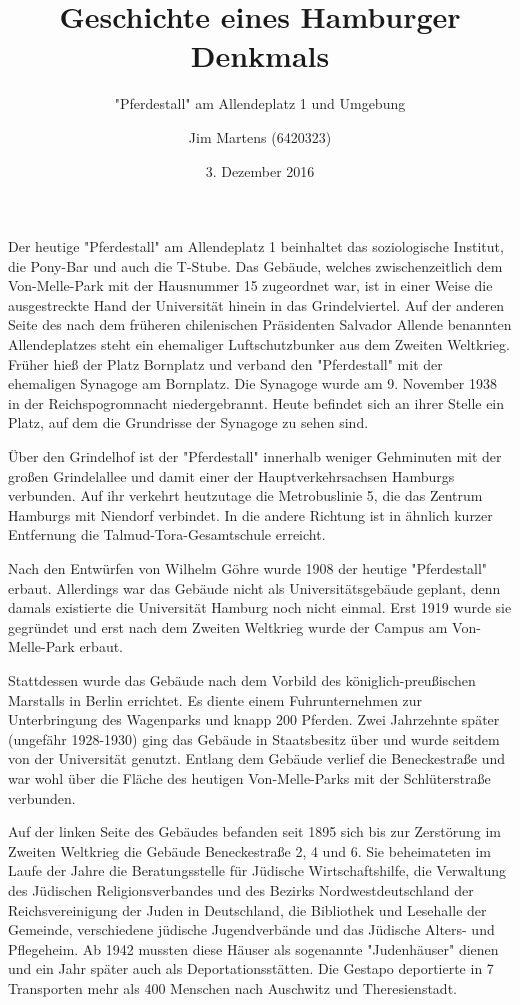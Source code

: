 \documentclass[10pt,a4paper,oneside,ngerman,numbers=noenddot]{scrartcl}
\begin{document}
\author{Jim Martens (6420323)}
\title{Geschichte eines Hamburger Denkmals}
\subtitle{"Pferdestall" am Allendeplatz 1 und Umgebung}
\date{3. Dezember 2016}
\maketitle

Der heutige "Pferdestall" am Allendeplatz 1 beinhaltet das soziologische Institut,
die Pony-Bar und auch die T-Stube. Das Gebäude, welches zwischenzeitlich dem
Von-Melle-Park mit der Hausnummer 15 zugeordnet war, ist in einer Weise die
ausgestreckte Hand der Universität hinein in das Grindelviertel. Auf der anderen
Seite des nach dem früheren chilenischen Präsidenten Salvador Allende benannten
Allendeplatzes steht ein ehemaliger Luftschutzbunker aus dem Zweiten Weltkrieg.
Früher hieß der Platz Bornplatz und verband den "Pferdestall" mit der ehemaligen
Synagoge am Bornplatz. Die Synagoge wurde am 9. November 1938 in der Reichspogromnacht
niedergebrannt. Heute befindet sich an ihrer Stelle ein Platz, auf dem die Grundrisse
der Synagoge zu sehen sind.

Über den Grindelhof ist der "Pferdestall" innerhalb weniger Gehminuten mit der
großen Grindelallee und damit einer der Hauptverkehrsachsen Hamburgs verbunden.
Auf ihr verkehrt heutzutage die Metrobuslinie 5, die das Zentrum Hamburgs mit
Niendorf verbindet.
In die andere Richtung ist in ähnlich kurzer Entfernung die Talmud-Tora-Gesamtschule
erreicht.

Nach den Entwürfen von Wilhelm Göhre wurde 1908 der heutige "Pferdestall" erbaut.
Allerdings war das Gebäude nicht als Universitätsgebäude geplant, denn damals
existierte die Universität Hamburg noch nicht einmal. Erst 1919 wurde sie gegründet
und erst nach dem Zweiten Weltkrieg wurde der Campus am Von-Melle-Park erbaut.

Stattdessen wurde das Gebäude nach dem Vorbild des königlich-preußischen Marstalls
in Berlin errichtet. Es diente einem Fuhrunternehmen zur Unterbringung des
Wagenparks und knapp 200 Pferden. Zwei Jahrzehnte später (ungefähr 1928-1930)
ging das Gebäude in Staatsbesitz über und wurde seitdem von der Universität genutzt.
Entlang dem Gebäude verlief die Beneckestraße und war wohl über die Fläche des
heutigen Von-Melle-Parks mit der Schlüterstraße verbunden.

Auf der linken Seite des Gebäudes befanden seit 1895 sich bis zur Zerstörung im
Zweiten Weltkrieg die Gebäude Beneckestraße 2, 4 und 6. Sie beheimateten im Laufe
der Jahre die Beratungsstelle für Jüdische Wirtschaftshilfe, die Verwaltung des
Jüdischen Religionsverbandes und des Bezirks Nordwestdeutschland der Reichsvereinigung
der Juden in Deutschland, die Bibliothek und Lesehalle der Gemeinde, verschiedene
jüdische Jugendverbände und das Jüdische Alters- und Pflegeheim. Ab 1942 mussten
diese Häuser als sogenannte "Judenhäuser" dienen und ein Jahr später auch als
Deportationsstätten. Die Gestapo deportierte in 7 Transporten mehr als 400 Menschen
nach Auschwitz und Theresienstadt.
\end{document}
